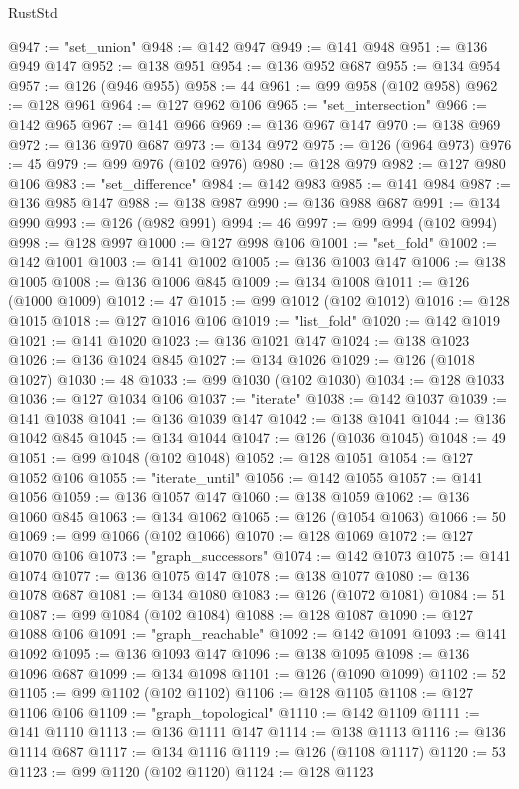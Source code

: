 \begin{lexlean}{RustStd}
\begin{coremodule}
@947 := "set_union"
@948 := @142 @947
@949 := @141 @948
@951 := @136 @949 @147
@952 := @138 @951
@954 := @136 @952 @687
@955 := @134 @954
@957 := @126 (@946 @955)
@958 := 44
@961 := @99 @958 (@102 @958)
@962 := @128 @961
@964 := @127 @962 @106
@965 := "set_intersection"
@966 := @142 @965
@967 := @141 @966
@969 := @136 @967 @147
@970 := @138 @969
@972 := @136 @970 @687
@973 := @134 @972
@975 := @126 (@964 @973)
@976 := 45
@979 := @99 @976 (@102 @976)
@980 := @128 @979
@982 := @127 @980 @106
@983 := "set_difference"
@984 := @142 @983
@985 := @141 @984
@987 := @136 @985 @147
@988 := @138 @987
@990 := @136 @988 @687
@991 := @134 @990
@993 := @126 (@982 @991)
@994 := 46
@997 := @99 @994 (@102 @994)
@998 := @128 @997
@1000 := @127 @998 @106
@1001 := "set_fold"
@1002 := @142 @1001
@1003 := @141 @1002
@1005 := @136 @1003 @147
@1006 := @138 @1005
@1008 := @136 @1006 @845
@1009 := @134 @1008
@1011 := @126 (@1000 @1009)
@1012 := 47
@1015 := @99 @1012 (@102 @1012)
@1016 := @128 @1015
@1018 := @127 @1016 @106
@1019 := "list_fold"
@1020 := @142 @1019
@1021 := @141 @1020
@1023 := @136 @1021 @147
@1024 := @138 @1023
@1026 := @136 @1024 @845
@1027 := @134 @1026
@1029 := @126 (@1018 @1027)
@1030 := 48
@1033 := @99 @1030 (@102 @1030)
@1034 := @128 @1033
@1036 := @127 @1034 @106
@1037 := "iterate"
@1038 := @142 @1037
@1039 := @141 @1038
@1041 := @136 @1039 @147
@1042 := @138 @1041
@1044 := @136 @1042 @845
@1045 := @134 @1044
@1047 := @126 (@1036 @1045)
@1048 := 49
@1051 := @99 @1048 (@102 @1048)
@1052 := @128 @1051
@1054 := @127 @1052 @106
@1055 := "iterate_until"
@1056 := @142 @1055
@1057 := @141 @1056
@1059 := @136 @1057 @147
@1060 := @138 @1059
@1062 := @136 @1060 @845
@1063 := @134 @1062
@1065 := @126 (@1054 @1063)
@1066 := 50
@1069 := @99 @1066 (@102 @1066)
@1070 := @128 @1069
@1072 := @127 @1070 @106
@1073 := "graph_successors"
@1074 := @142 @1073
@1075 := @141 @1074
@1077 := @136 @1075 @147
@1078 := @138 @1077
@1080 := @136 @1078 @687
@1081 := @134 @1080
@1083 := @126 (@1072 @1081)
@1084 := 51
@1087 := @99 @1084 (@102 @1084)
@1088 := @128 @1087
@1090 := @127 @1088 @106
@1091 := "graph_reachable"
@1092 := @142 @1091
@1093 := @141 @1092
@1095 := @136 @1093 @147
@1096 := @138 @1095
@1098 := @136 @1096 @687
@1099 := @134 @1098
@1101 := @126 (@1090 @1099)
@1102 := 52
@1105 := @99 @1102 (@102 @1102)
@1106 := @128 @1105
@1108 := @127 @1106 @106
@1109 := "graph_topological"
@1110 := @142 @1109
@1111 := @141 @1110
@1113 := @136 @1111 @147
@1114 := @138 @1113
@1116 := @136 @1114 @687
@1117 := @134 @1116
@1119 := @126 (@1108 @1117)
@1120 := 53
@1123 := @99 @1120 (@102 @1120)
@1124 := @128 @1123

\end{coremodule}
\end{lexlean}
